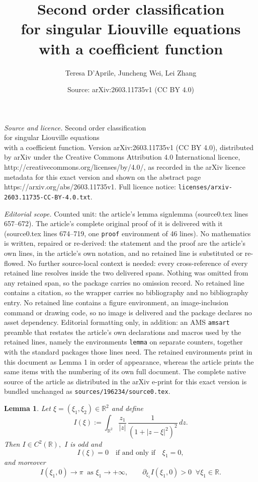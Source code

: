 \documentclass[10pt,a4paper]{amsart}
\title{{\Large{Second order classification \\ for singular Liouville equations \\ \vspace{1mm} with a coefficient function}}}
\author{Teresa D'Aprile, Juncheng Wei, Lei Zhang}
\date{Source: arXiv:2603.11735v1 (CC BY 4.0)}
\newtheorem{lemma}{Lemma}
\newcommand{\R}{\mathbb{R}}
\begin{document}
\maketitle

\noindent\emph{Source and licence.} {\Large{Second order classification \\ for singular Liouville equations \\ \vspace{1mm} with a coefficient function}}. Version arXiv:2603.11735v1 (CC BY 4.0), distributed by arXiv under the Creative Commons Attribution 4.0 International licence, http://creativecommons.org/licenses/by/4.0/, as recorded in the arXiv licence metadata for this exact version and shown on the abstract page https://arxiv.org/abs/2603.11735v1. Full licence notice: \texttt{licenses/arxiv-2603.11735-CC-BY-4.0.txt}.\par\smallskip

\noindent\textit{Editorial scope.} Counted unit: the article's lemma signlemma (source0.tex lines 657--672). The article's complete original proof of it is delivered with it (source0.tex lines 674--719, one \texttt{proof} environment of 46 lines). No mathematics is written, repaired or re-derived: the statement and the proof are the article's own lines, in the article's own notation, and no retained line is substituted or re-flowed.  No further source-local context is needed: every cross-reference of every retained line resolves inside the two delivered spans.  Nothing was omitted from any retained span, so the package carries no omission record.  No retained line contains a citation, so the wrapper carries no bibliography and no bibliography entry.  No retained line contains a figure environment, an image-inclusion command or drawing code, so no image is delivered and the package declares no asset dependency.  Editorial formatting only, in addition: an AMS \texttt{amsart} preamble that restates the article's own declarations and macros used by the retained lines, namely the environments \texttt{lemma} on separate counters, together with the standard packages those lines need.  The retained environments print in this document as Lemma 1 in order of appearance, whereas the article prints the same items with the numbering of its own full document.  The complete native source of the article as distributed in the arXiv e-print for this exact version is bundled unchanged as \texttt{sources/196234/source0.tex}.
\begin{lemma}\label{signlemma}
Let $\xi=(\xi_1,\xi_2)\in\R^2$ and define
$$
I(\xi):=\int_{\R^2}\frac{z_1}{|z|}\,\frac{1}{(1+|z-\xi|^2)^2}\,dz.
$$
Then $I\in C^2(\R),$ $I$ is odd and 
$$
I(\xi)=0 \quad \text{if and only if} \quad \xi_1=0,
$$
and moreover
$$
I(\xi_1,0)\to \pi  \ \text{ as } \xi_1\to +\infty,
\qquad
\partial_{\xi_1}I(\xi_1,0)>0 \;\;\forall \xi_1\in\R.
$$
\end{lemma}
\end{document}
